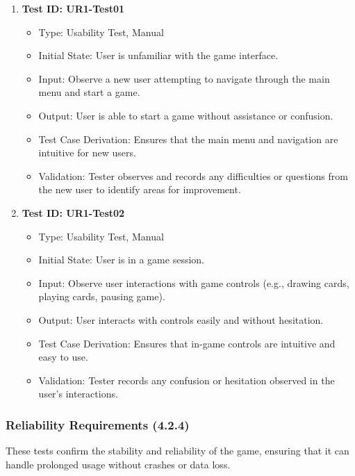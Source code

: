 \documentclass[12pt, titlepage]{article}
\begin{document}
\begin{enumerate}
    \item \textbf{Test ID: UR1-Test01}
        \begin{itemize}
            \item Type: Usability Test, Manual
            \item Initial State: User is unfamiliar with the game interface.
            \item Input: Observe a new user attempting to navigate through the main menu and start a game.
            \item Output: User is able to start a game without assistance or confusion.
            \item Test Case Derivation: Ensures that the main menu and navigation are intuitive for new users.
            \item Validation: Tester observes and records any difficulties or questions from the new user to identify areas for improvement.
        \end{itemize}

    \item \textbf{Test ID: UR1-Test02}
        \begin{itemize}
            \item Type: Usability Test, Manual
            \item Initial State: User is in a game session.
            \item Input: Observe user interactions with game controls (e.g., drawing cards, playing cards, pausing game).
            \item Output: User interacts with controls easily and without hesitation.
            \item Test Case Derivation: Ensures that in-game controls are intuitive and easy to use.
            \item Validation: Tester records any confusion or hesitation observed in the user’s interactions.
        \end{itemize}
\end{enumerate}

\subsubsection{Reliability Requirements (4.2.4)}

These tests confirm the stability and reliability of the game, ensuring that it can handle prolonged usage without crashes or data loss.
\end{document}
